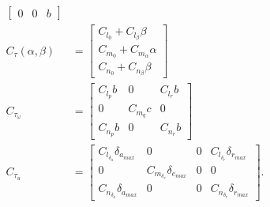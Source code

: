 \documentclass{article}
\begin{document}
\begin{appendices}
\begin{align}
\begin{bmatrix}
0 & 0 & b
\end{bmatrix}\\
C_{\tau}\left(\alpha,\beta\right) & =\begin{bmatrix}C_{l_{0}}+C_{l_{\beta}}\beta\\
C_{m_{0}}+C_{m_{\alpha}}\alpha\\
C_{n_{0}}+C_{n_{\beta}}\beta
\end{bmatrix}\\
C_{\tau_{\omega}} & =\begin{bmatrix}C_{l_{p}}b & 0 & C_{l_{r}}b\\
0 & C_{m_{q}}c & 0\\
C_{n_{p}}b & 0 & C_{n_{r}}b
\end{bmatrix}\\
C_{\tau_{u}} & =\begin{bmatrix}C_{l_{\delta_{a}}}\delta_{a_{max}} & 0 & 0 & C_{l_{\delta_{r}}}\delta_{r_{max}}\\
0 & C_{m_{\delta_{e}}}\delta_{e_{max}} & 0 & 0\\
C_{n_{\delta_{a}}}\delta_{a_{max}} & 0 & 0 & C_{n_{\delta_{r}}}\delta_{r_{max}}
\end{bmatrix}.
\end{align}
\end{appendices}




\end{document}
